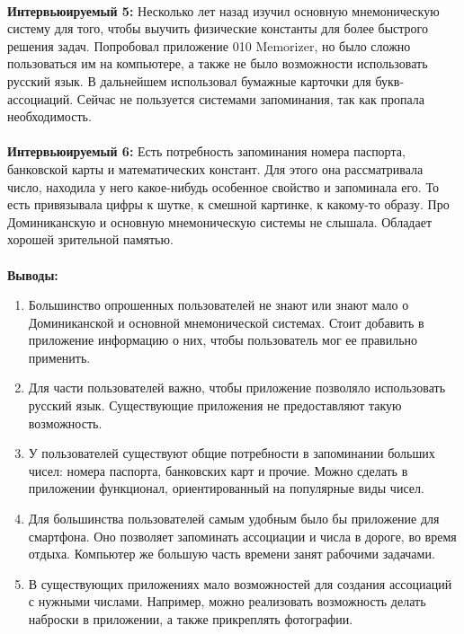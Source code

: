 \documentclass[draft]{article}
\begin{document}
~\\
\textbf{Интервьюируемый 5:} Несколько лет назад изучил основную мнемоническую систему для того, чтобы выучить физические константы для более быстрого решения задач. Попробовал приложение 010 Memorizer, но было сложно пользоваться им на компьютере, а также не было возможности использовать русский язык. В дальнейшем использовал бумажные карточки для букв-ассоциаций. Сейчас не пользуется системами запоминания, так как пропала необходимость.\\
~\\
\textbf{Интервьюируемый 6:} Есть потребность запоминания номера паспорта, банковской карты и математических констант. Для этого она рассматривала число, находила у него какое-нибудь особенное свойство и запоминала его. То есть привязывала цифры к шутке, к смешной картинке, к какому-то образу. Про Доминиканскую и основную мнемоническую системы не слышала. Обладает хорошей зрительной памятью.\\
~\\
\textbf{Выводы:}
\begin{enumerate}
\item Большинство опрошенных пользователей не знают или знают мало о Доминиканской и основной мнемонической системах. Стоит добавить в приложение информацию о них, чтобы пользователь мог ее правильно применить.
\item Для части пользователей важно, чтобы приложение позволяло использовать русский язык. Существующие приложения не предоставляют такую возможность.
\item У пользователей существуют общие потребности в запоминании больших чисел: номера паспорта, банковских карт и прочие. Можно сделать в приложении функционал, ориентированный на популярные виды чисел.
\item Для большинства пользователей самым удобным было бы приложение для смартфона. Оно позволяет запоминать ассоциации и числа в дороге, во время отдыха. Компьютер же большую часть времени занят рабочими задачами.
\item В существующих приложениях мало возможностей для создания ассоциаций с нужными числами. Например, можно реализовать возможность делать наброски в приложении, а также прикреплять фотографии.
\end{enumerate}
\end{document}
